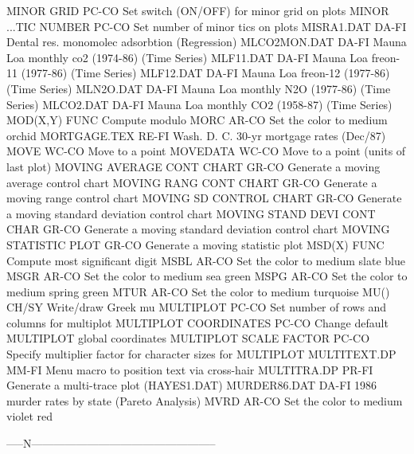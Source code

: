MINOR GRID                  PC-CO Set switch (ON/OFF) for minor grid on plots
MINOR ...TIC NUMBER         PC-CO Set number of minor tics on plots
MISRA1.DAT                  DA-FI Dental res. monomolec adsorbtion (Regression)
MLCO2MON.DAT                DA-FI Mauna Loa monthly co2 (1974-86) (Time Series)
MLF11.DAT                   DA-FI Mauna Loa freon-11 (1977-86) (Time Series)
MLF12.DAT                   DA-FI Mauna Loa freon-12 (1977-86) (Time Series)
MLN2O.DAT                   DA-FI Mauna Loa monthly N2O (1977-86) (Time Series)
MLCO2.DAT                   DA-FI Mauna Loa monthly CO2 (1958-87) (Time Series)
MOD(X,Y)                    FUNC  Compute modulo
MORC                        AR-CO Set the color to medium orchid
MORTGAGE.TEX                RE-FI Wash. D. C. 30-yr mortgage rates (Dec/87)
MOVE                        WC-CO Move to a point
MOVEDATA                    WC-CO Move to a point (units of last plot)
MOVING AVERAGE CONT CHART   GR-CO Generate a moving average control chart
MOVING RANG CONT CHART      GR-CO Generate a moving range control chart
MOVING SD CONTROL CHART     GR-CO Generate a moving standard deviation control chart
MOVING STAND DEVI CONT CHAR GR-CO Generate a moving standard deviation control chart
MOVING STATISTIC PLOT       GR-CO Generate a moving statistic plot
MSD(X)                      FUNC  Compute most significant digit
MSBL                        AR-CO Set the color to medium slate blue
MSGR                        AR-CO Set the color to medium sea green
MSPG                        AR-CO Set the color to medium spring green
MTUR                        AR-CO Set the color to medium turquoise
MU()                        CH/SY Write/draw Greek mu
MULTIPLOT                   PC-CO Set number of rows and columns for multiplot
MULTIPLOT COORDINATES       PC-CO Change default MULTIPLOT global coordinates
MULTIPLOT SCALE FACTOR      PC-CO Specify multiplier factor for character sizes for MULTIPLOT
MULTITEXT.DP                MM-FI Menu macro to position text via cross-hair
MULTITRA.DP                 PR-FI Generate a multi-trace plot (HAYES1.DAT)
MURDER86.DAT                DA-FI 1986 murder rates by state (Pareto Analysis)
MVRD                        AR-CO Set the color to medium violet red

-----N--------------------------------------------------

